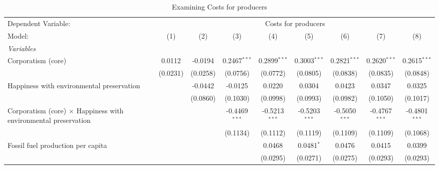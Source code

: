 
\begin{table}[htbp]
   \caption{Examining Costs for producers}
   \centering
   \begin{tabular}{lcccccccc}
      \tabularnewline \midrule \midrule
      Dependent Variable: & \multicolumn{8}{c}{Costs for producers}\\
      Model:                                                                 & (1)      & (2)      & (3)             & (4)             & (5)             & (6)             & (7)             & (8)\\  
      \midrule
      \emph{Variables}\\
      Corporatism (core)                                                     & 0.0112   & -0.0194  & 0.2467$^{***}$  & 0.2899$^{***}$  & 0.3003$^{***}$  & 0.2821$^{***}$  & 0.2620$^{***}$  & 0.2615$^{***}$\\   
                                                                             & (0.0231) & (0.0258) & (0.0756)        & (0.0772)        & (0.0805)        & (0.0838)        & (0.0835)        & (0.0848)\\   
      Happiness with environmental preservation                              &          & -0.0442  & -0.0125         & 0.0220          & 0.0304          & 0.0423          & 0.0347          & 0.0325\\   
                                                                             &          & (0.0860) & (0.1030)        & (0.0998)        & (0.0993)        & (0.0982)        & (0.1050)        & (0.1017)\\   
      Corporatism (core) $\times$ Happiness with environmental preservation  &          &          & -0.4469$^{***}$ & -0.5213$^{***}$ & -0.5203$^{***}$ & -0.5050$^{***}$ & -0.4767$^{***}$ & -0.4801$^{***}$\\   
                                                                             &          &          & (0.1134)        & (0.1112)        & (0.1119)        & (0.1109)        & (0.1109)        & (0.1068)\\   
      Fossil fuel production per capita                                      &          &          &                 & 0.0468          & 0.0481$^{*}$    & 0.0476          & 0.0415          & 0.0399\\   
                                                                             &          &          &                 & (0.0295)        & (0.0271)        & (0.0275)        & (0.0293)        & (0.0293)\\   

\end{tabular}
\end{table}

